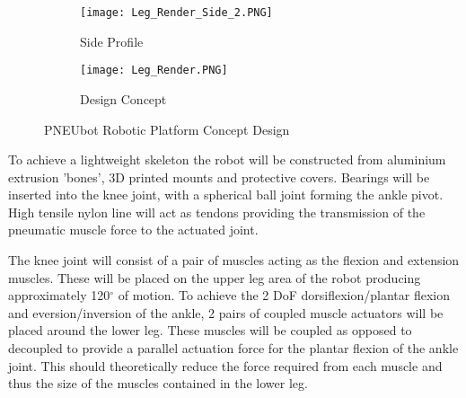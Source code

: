 \documentclass[11pt,a4paper]{article}
\begin{document}
\begin{figure}[hbt!]
    \centering
    \begin{subfigure}[t]{0.4 \textwidth}
        \centering
        \caption{Side Profile}
        \texttt{[image: Leg\_Render\_Side\_2.PNG]}
        \label{fig:platform_side}
    \end{subfigure}
    \begin{subfigure}[t]{0.4 \textwidth}
        \centering
        \caption{Design Concept}
        \texttt{[image: Leg\_Render.PNG]}
        \label{fig:platform_angle}
    \end{subfigure}
    
    \caption{PNEUbot Robotic Platform Concept Design}
    \label{fig:platform}
\end{figure}

To achieve a lightweight skeleton the robot will be constructed from aluminium extrusion 'bones', 3D printed mounts and protective covers. Bearings will be inserted into the knee joint, with a spherical ball joint forming the ankle pivot. High tensile nylon line will act as tendons providing the transmission of the pneumatic muscle force to the actuated joint. \newline

The knee joint will consist of a pair of muscles acting as the flexion and extension muscles. These will be placed on the upper leg area of the robot producing approximately 120$^{\circ}$ of motion. To achieve the 2 DoF dorsiflexion/plantar flexion and eversion/inversion of the ankle, 2 pairs of coupled muscle actuators will be placed around the lower leg. These muscles will be coupled as opposed to decoupled to provide a parallel actuation force for the plantar flexion of the ankle joint. This should theoretically reduce the force required from each muscle and thus the size of the muscles contained in the lower leg. 
\end{document}
